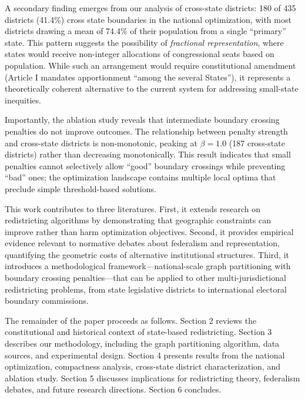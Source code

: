 A secondary finding emerges from our analysis of cross-state districts: 180 of 435 districts (41.4\%) cross state boundaries in the national optimization, with most districts drawing a mean of 74.4\% of their population from a single ``primary'' state. This pattern suggests the possibility of \textit{fractional representation}, where states would receive non-integer allocations of congressional seats based on population. While such an arrangement would require constitutional amendment (Article I mandates apportionment ``among the several States''), it represents a theoretically coherent alternative to the current system for addressing small-state inequities.

Importantly, the ablation study reveals that intermediate boundary crossing penalties do not improve outcomes. The relationship between penalty strength and cross-state districts is non-monotonic, peaking at $ \beta = 1.0 $ (187 cross-state districts) rather than decreasing monotonically. This result indicates that small penalties cannot selectively allow ``good'' boundary crossings while preventing ``bad'' ones; the optimization landscape contains multiple local optima that preclude simple threshold-based solutions.

This work contributes to three literatures. First, it extends research on redistricting algorithms by demonstrating that geographic constraints can improve rather than harm optimization objectives. Second, it provides empirical evidence relevant to normative debates about federalism and representation, quantifying the geometric costs of alternative institutional structures. Third, it introduces a methodological framework---national-scale graph partitioning with boundary crossing penalties---that can be applied to other multi-jurisdictional redistricting problems, from state legislative districts to international electoral boundary commissions.

The remainder of the paper proceeds as follows. Section 2 reviews the constitutional and historical context of state-based redistricting. Section 3 describes our methodology, including the graph partitioning algorithm, data sources, and experimental design. Section 4 presents results from the national optimization, compactness analysis, cross-state district characterization, and ablation study. Section 5 discusses implications for redistricting theory, federalism debates, and future research directions. Section 6 concludes.
